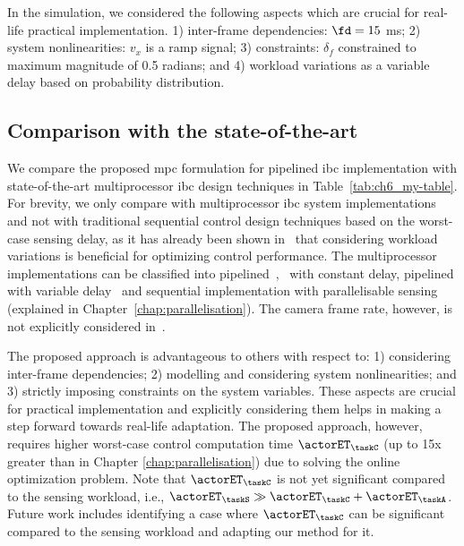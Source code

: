 In the simulation, we considered the following aspects which are crucial for real-life practical implementation. 1) inter-frame dependencies: $\fd=15$ ms; 2) system nonlinearities: $v_x$ is a ramp signal; 3) constraints: $\delta_f$ constrained to maximum magnitude of 0.5 radians; and 4) workload variations as a variable delay based on probability distribution. 

\subsection{Comparison with the state-of-the-art}
We compare the proposed \gls{mpc} formulation for pipelined \gls{ibc} implementation with state-of-the-art multiprocessor \gls{ibc} design techniques in Table~\ref{tab:ch6_my-table}. 
For brevity, we only compare with multiprocessor \gls{ibc} system implementations and not with traditional sequential control design techniques based on the worst-case sensing delay, as it has already been shown in~\cite{fontantelli2013optimal} that considering workload variations is beneficial for optimizing control performance.
The multiprocessor implementations can be classified into pipelined~\cite{medina2019designing},~\cite{krautgartner1998performance} with constant delay, pipelined with variable delay~\cite{medina2019implementation} and sequential implementation with parallelisable sensing (explained in Chapter~\ref{chap:parallelisation}).
The camera frame rate, however, is not explicitly considered in~\cite{krautgartner1998performance}.

The proposed approach is advantageous to others with respect to: 1) considering inter-frame dependencies; 2) modelling and considering system nonlinearities; and 3) strictly imposing constraints on the system variables. 
These aspects are crucial for practical implementation and explicitly considering them helps in making a step forward towards real-life adaptation.
The proposed approach, however, requires higher worst-case control computation time $\actorET_\taskC$ (up to 15x greater than in Chapter \ref{chap:parallelisation}) due to solving the online optimization problem.
Note that $\actorET_\taskC$ is not yet significant compared to the sensing workload, i.e., ${\actorET_\taskS \gg \actorET_\taskC+\actorET_\taskA}$.
Future work includes identifying a case where $\actorET_\taskC$ can be significant compared to the sensing workload and adapting our method for it.